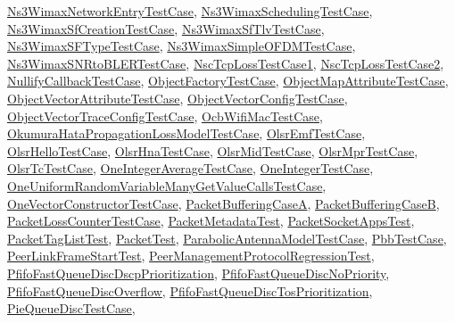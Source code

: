 \hyperlink{classNs3WimaxNetworkEntryTestCase}{Ns3\+Wimax\+Network\+Entry\+Test\+Case}, \hyperlink{classNs3WimaxSchedulingTestCase}{Ns3\+Wimax\+Scheduling\+Test\+Case}, \hyperlink{classNs3WimaxSfCreationTestCase}{Ns3\+Wimax\+Sf\+Creation\+Test\+Case}, \hyperlink{classNs3WimaxSfTlvTestCase}{Ns3\+Wimax\+Sf\+Tlv\+Test\+Case}, \hyperlink{classNs3WimaxSFTypeTestCase}{Ns3\+Wimax\+S\+F\+Type\+Test\+Case}, \hyperlink{classNs3WimaxSimpleOFDMTestCase}{Ns3\+Wimax\+Simple\+O\+F\+D\+M\+Test\+Case}, \hyperlink{classNs3WimaxSNRtoBLERTestCase}{Ns3\+Wimax\+S\+N\+Rto\+B\+L\+E\+R\+Test\+Case}, \hyperlink{classNscTcpLossTestCase1}{Nsc\+Tcp\+Loss\+Test\+Case1}, \hyperlink{classNscTcpLossTestCase2}{Nsc\+Tcp\+Loss\+Test\+Case2}, \hyperlink{classNullifyCallbackTestCase}{Nullify\+Callback\+Test\+Case}, \hyperlink{classObjectFactoryTestCase}{Object\+Factory\+Test\+Case}, \hyperlink{classObjectMapAttributeTestCase}{Object\+Map\+Attribute\+Test\+Case}, \hyperlink{classObjectVectorAttributeTestCase}{Object\+Vector\+Attribute\+Test\+Case}, \hyperlink{classObjectVectorConfigTestCase}{Object\+Vector\+Config\+Test\+Case}, \hyperlink{classObjectVectorTraceConfigTestCase}{Object\+Vector\+Trace\+Config\+Test\+Case}, \hyperlink{classOcbWifiMacTestCase}{Ocb\+Wifi\+Mac\+Test\+Case}, \hyperlink{classOkumuraHataPropagationLossModelTestCase}{Okumura\+Hata\+Propagation\+Loss\+Model\+Test\+Case}, \hyperlink{classOlsrEmfTestCase}{Olsr\+Emf\+Test\+Case}, \hyperlink{classOlsrHelloTestCase}{Olsr\+Hello\+Test\+Case}, \hyperlink{classOlsrHnaTestCase}{Olsr\+Hna\+Test\+Case}, \hyperlink{classOlsrMidTestCase}{Olsr\+Mid\+Test\+Case}, \hyperlink{classOlsrMprTestCase}{Olsr\+Mpr\+Test\+Case}, \hyperlink{classOlsrTcTestCase}{Olsr\+Tc\+Test\+Case}, \hyperlink{classOneIntegerAverageTestCase}{One\+Integer\+Average\+Test\+Case}, \hyperlink{classOneIntegerTestCase}{One\+Integer\+Test\+Case}, \hyperlink{classOneUniformRandomVariableManyGetValueCallsTestCase}{One\+Uniform\+Random\+Variable\+Many\+Get\+Value\+Calls\+Test\+Case}, \hyperlink{classOneVectorConstructorTestCase}{One\+Vector\+Constructor\+Test\+Case}, \hyperlink{classPacketBufferingCaseA}{Packet\+Buffering\+CaseA}, \hyperlink{classPacketBufferingCaseB}{Packet\+Buffering\+CaseB}, \hyperlink{classPacketLossCounterTestCase}{Packet\+Loss\+Counter\+Test\+Case}, \hyperlink{classPacketMetadataTest}{Packet\+Metadata\+Test}, \hyperlink{classPacketSocketAppsTest}{Packet\+Socket\+Apps\+Test}, \hyperlink{classPacketTagListTest}{Packet\+Tag\+List\+Test}, \hyperlink{classPacketTest}{Packet\+Test}, \hyperlink{classParabolicAntennaModelTestCase}{Parabolic\+Antenna\+Model\+Test\+Case}, \hyperlink{classPbbTestCase}{Pbb\+Test\+Case}, \hyperlink{structPeerLinkFrameStartTest}{Peer\+Link\+Frame\+Start\+Test}, \hyperlink{classPeerManagementProtocolRegressionTest}{Peer\+Management\+Protocol\+Regression\+Test}, \hyperlink{classPfifoFastQueueDiscDscpPrioritization}{Pfifo\+Fast\+Queue\+Disc\+Dscp\+Prioritization}, \hyperlink{classPfifoFastQueueDiscNoPriority}{Pfifo\+Fast\+Queue\+Disc\+No\+Priority}, \hyperlink{classPfifoFastQueueDiscOverflow}{Pfifo\+Fast\+Queue\+Disc\+Overflow}, \hyperlink{classPfifoFastQueueDiscTosPrioritization}{Pfifo\+Fast\+Queue\+Disc\+Tos\+Prioritization}, \hyperlink{classPieQueueDiscTestCase}{Pie\+Queue\+Disc\+Test\+Case}, 